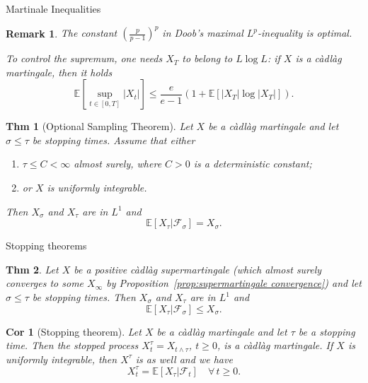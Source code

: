 \documentclass[a4paper]{article}
\theoremstyle{mytheoremstyle}
\newtheorem{theorem}{Thm}
\newtheorem{corollary}{Cor}[theorem]
\newtheorem*{remark}{Remark}
\newcommand{\1}{\mathds{1}}
\begin{document}
\begin{multicols*}{3}
\begin{roundbox}{Martinale Inequalities}
\begin{remark}
  The constant $\left( \frac{p}{p - 1} \right)^p$ in Doob's maximal
  $L^p$-inequality  is optimal.   

  To control the supremum, one needs $X_T$ to belong to $L \log L$: if $X$ is
  a c{\`a}dl{\`a}g martingale, then it holds
  \[
    \mathbb{E} \left[\sup_{t \in [0, T]} | X_t | \right] \leqslant \frac{e}{e - 1} (1
     +\mathbb{E} [| X_T | \log | X_T |]).
  \]
\end{remark}

\begin{theorem}[Optional Sampling Theorem]
  \label{thm:optional-sampling}Let $X$ be a c{\`a}dl{\`a}g martingale and let
  $\sigma \leqslant \tau$ be stopping times. Assume that either
  \begin{enumerate}
    \item $\tau \leqslant C < \infty$ almost surely, where $C > 0$ is a
    deterministic constant;
    
    \item or $X$ is uniformly integrable.
  \end{enumerate}
  Then $X_{\sigma}$ and $X_{\tau}$ are in $L^1$ and
  \[
    \mathbb{E} \left[X_{\tau} |\mathcal{F}_{\sigma} \right] = X_{\sigma} .
  \]
\end{theorem}
\end{roundbox}

\begin{roundbox}{Stopping theorems}
\begin{theorem}
  \label{thm:optional.supermartingale}Let $X$ be a positive c{\`a}dl{\`a}g
  supermartingale (which almost surely converges to some $X_{\infty}$ by
  Proposition~\ref{prop:supermartingale convergence}) and let $\sigma
  \leqslant \tau$ be stopping times. Then $X_{\sigma}$ and $X_{\tau}$ are in
  $L^1$ and
  \[ \mathbb{E} [X_{\tau} |\mathcal{F}_{\sigma}] \leqslant X_{\sigma} . \]
\end{theorem}

\begin{corollary}[Stopping theorem]
  \label{cor:stopping.theorem}Let $X$ be a c{\`a}dl{\`a}g martingale and let
  $\tau$ be a stopping time. Then the stopped process $X^{\tau}_t = X_{t
  \wedge \tau}$, $t \geqslant 0$, is a c{\`a}dl{\`a}g martingale. If $X$ is
  uniformly integrable, then $X^{\tau}$ is as well and we have
  \begin{equation}
    X^{\tau}_t =\mathbb{E} [X_{\tau} |\mathcal{F}_t] \quad \forall \, t
    \geqslant 0. \label{eq:stopping.theorem}
  \end{equation}
\end{corollary}


\end{roundbox}
\end{multicols*}
\end{document}

